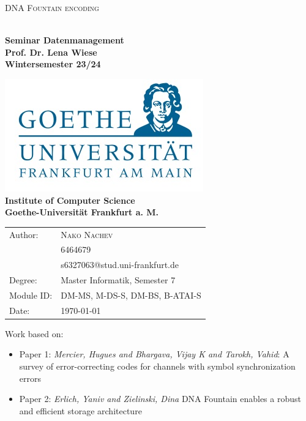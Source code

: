 \documentclass[12pt]%
{article}
\begin{document}
\begin{titlepage}

\begin{center}

{\Huge %
 
{%
\textsc{DNA Fountain encoding}}}
\\[2ex]




\textbf{
\Large Seminar Datenmanagement\\ 
Prof. Dr. Lena Wiese \\ 
Wintersemester 23/24
}

\includegraphics[scale=0.4]{logo.jpg} \\ 
\large{\textbf{Institute of Computer Science \\ Goethe-Universit\"at Frankfurt a. M.}}



\begin{Large}
\begin{tabular}{ll}
\\
Author: & \textsc{Nako Nachev} \\
& 6464679\\
& s6327063@stud.uni-frankfurt.de \\
Degree:&  Master Informatik, Semester 7 \\
Module ID: & DM-MS, M-DS-S, DM-BS, B-ATAI-S \\
Date: & \today \\		
\end{tabular}
\end{Large}

\end{center}

\vspace*{\fill}

\large
\noindent{}Work based on: \\
\begin{itemize}
\item Paper 1: \emph{Mercier, Hugues and Bhargava, Vijay K and Tarokh, Vahid}: A survey of error-correcting codes for channels with symbol synchronization errors
\item Paper 2: \emph{Erlich, Yaniv and Zielinski, Dina} DNA Fountain enables a robust and efficient storage architecture
\end{itemize}


\end{titlepage}
\end{document}
